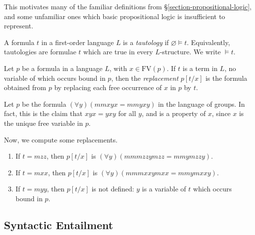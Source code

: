\documentclass{article}
\begin{document}
This motivates many of the familiar definitions from \S\ref{section-propositional-logic}, and some unfamiliar ones which basic propositional logic is insufficient to represent.

\begin{definition}[Tautology]
    A formula $t$ in a first-order language $L$ is a \textit{tautology} if $\varnothing \vDash t$.
    Equivalently, tautologies are formulae $t$ which are true in every $L$-structure.
    We write $\vDash t$.
\end{definition}

\begin{definition}[Replacement]
    Let $p$ be a formula in a language $L$, with $x \in \mathrm{FV}(p)$. If $t$ is a term in $L$, no variable of which occurs bound in $p$, then the \textit{replacement} $p[t/x]$ is the formula obtained from $p$ by replacing each free occurrence of $x$ in $p$ by $t$.
\end{definition}

\begin{example}
	Let $p$ be the formula $(\forall y)(mmxyx=mmyxy)$ in the language of groups. In fact, this is the claim that $xyx = yxy$ for all $y$, and is a property of $x$, since $x$ is the unique free variable in $p$.
	
	Now, we compute some replacements.
	\begin{enumerate}
	    \item If $t = mzz$, then $p[t/x]$ is $(\forall y)(mmmzzymzz=mmymzzy)$.
	    \item If $t = mxx$, then $p[t/x]$ is $(\forall y)(mmmxxymxx=mmymxxy)$.
	    \item If $t = myy$, then $p[t/x]$ is not defined: $y$ is a variable of $t$ which occurs bound in $p$.
	\end{enumerate}
\end{example}


\subsection{Syntactic Entailment}
\label{section-first-order-syntactic-entailment}
\end{document}
